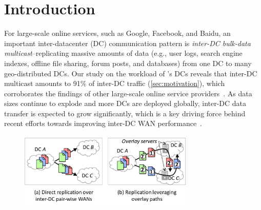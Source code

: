 \section{Introduction}

For large-scale online services, such as Google, Facebook, and
Baidu, an important inter-datacenter (DC) communication pattern is
{\em inter-DC bulk-data multicast}--replicating massive amounts of data
(e.g., user logs, search engine indexes, offline file sharing,
forum posts, and databases)
from one DC to many geo-distributed DCs.
Our study on the workload of
\company{}'s DCs reveals that
inter-DC multicast amounts to 91\% of inter-DC traffic
(\Section\ref{sec:motivation}), which corroborates the findings of
other large-scale online service providers~\cite{kumar2015bwe,zhang2016piebridge}.
As data sizes continue to explode and more DCs are deployed
globally, inter-DC data transfer is expected
to grow significantly, which is a key driving force behind
recent efforts towards improving inter-DC WAN
performance~\cite{savage1999Theend,jain2013b4,kumar2015bwe,hong2013achieving,zhang2015guarantee}.




\begin{figure}[t!]
\includegraphics[width=83mm]{images/intro-example.pdf}
\vspace{-0.4cm}
\label{fig:intro}
\vspace{-0.4cm}
\end{figure}

